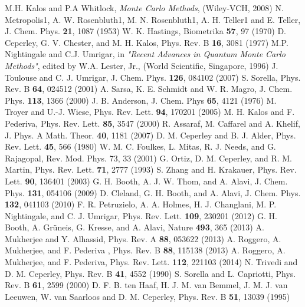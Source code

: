 \begin{thebibliography}{99.}%
M.H. Kalos and P.A Whitlock, {\em Monte Carlo Methods}, (Wiley-VCH, 2008)
N. Metropolis1, A. W. Rosenbluth1, M. N. Rosenbluth1, A. H. Teller1 and E. Teller,  J. Chem. Phys. {\bf 21}, 1087 (1953)
W. K. Hastings,  Biometrika {\bf 57}, 97 (1970)
D. Ceperley, G. V. Chester, and M. H. Kalos, Phys. Rev. B {\bf 16}, 3081 (1977)
M.P. Nightingale and C.J. Umrigar, in \emph{"Recent Advances in Quantum Monte Carlo Methods"}, edited by W.A. Lester, Jr., (World Scientific, Singapore, 1996)
J. Toulouse and C. J. Umrigar,  J. Chem. Phys. {\bf 126}, 084102 (2007)
S. Sorella,  Phys. Rev. B {\bf 64}, 024512 (2001)
A. Sarsa, K. E. Schmidt and W. R. Magro, J. Chem. Phys. {\bf 113}, 1366 (2000)
J. B. Anderson,  J. Chem. Phys {\bf 65}, 4121 (1976)
M. Troyer and U.-J. Wiese,  Phys. Rev. Lett. {\bf 94}, 170201 (2005)
M. H. Kalos and F. Pederiva, Phys. Rev. Lett. {\bf 85}, 3547 (2000)
R. Assaraf, M. Caffarel and A. Khelif,  J. Phys. A Math. Theor. {\bf 40}, 1181 (2007)
D. M. Ceperley and B. J. Alder, Phys. Rev. Lett. {\bf 45}, 566 (1980)
W. M. C. Foulkes, L. Mitas, R. J. Needs, and G. Rajagopal, Rev. Mod. Phys. 73, 33 (2001)
G. Ortiz, D. M. Ceperley, and R. M. Martin, Phys. Rev. Lett. {\bf 71}, 2777 (1993)
S. Zhang and H. Krakauer,  Phys. Rev. Lett. {\bf 90}, 136401 (2003)
G. H. Booth, A. J. W. Thom, and A. Alavi,  J. Chem. Phys. {\bf 131}, 054106 (2009)
D. Cleland, G. H. Booth, and A. Alavi, J. Chem. Phys. {\bf 132}, 041103 (2010)
F. R. Petruzielo, A. A. Holmes, H. J. Changlani, M. P.
Nightingale, and C. J. Umrigar, Phys. Rev. Lett. {\bf 109},
230201 (2012)
G. H. Booth, A. Gr\"uneis, G. Kresse, and A. Alavi, Nature
{\bf 493}, 365 (2013)
A. Mukherjee and Y. Alhassid,
 Phys. Rev. A {\bf 88}, 053622 (2013)
A. Roggero, A. Mukherjee, and F. Pederiva , 
 Phys. Rev. B {\bf 88}, 115138 (2013)
A. Roggero, A. Mukherjee, and F. Pederiva,
 Phys. Rev. Lett. {\bf 112}, 221103 (2014)
N. Trivedi and D. M. Ceperley, Phys. Rev. B {\bf 41}, 4552 (1990)
S. Sorella and L. Capriotti,  Phys. Rev. B {\bf 61}, 2599 (2000)
D. F. B. ten Haaf, H. J. M. van Bemmel, J. M. J. van Leeuwen, W. van Saarloos and D. M. Ceperley,  Phys. Rev. B {\bf 51}, 13039 (1995)

\end{thebibliography}
